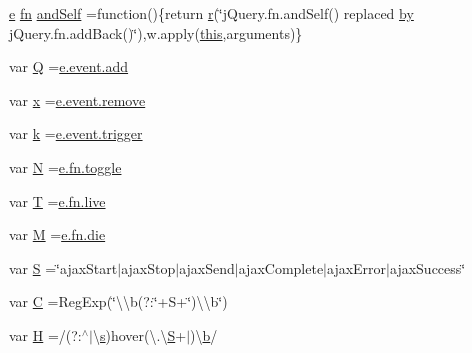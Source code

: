 \begin{DoxyCompactItemize}
\item 
\hyperlink{spin_8min_8js_ad61019675a546296be52534d8b2ac577}{e} \hyperlink{jquery-2_81_83_8min_8js_a4f0af84f62a6e2f4aee1d072192b48ec}{fn} \hyperlink{jquery-migrate-1_82_81_8min_8js_a87feebad0d5e7f093f60e89bd1135092}{and\+Self} =function()\{return \hyperlink{jquery_8nanoscroller_8min_8js_a514f1b439f404f86f77090fa9edc96ce}{r}(\char`\"{}j\+Query.\+fn.\+and\+Self() replaced \hyperlink{43ef607ee92d94826432d1d6f09372e1_8js_a379c856a3fa78254070a35def2e7b16b}{by} j\+Query.\+fn.\+add\+Back()\char`\"{}),w.\+apply(\hyperlink{spin_8min_8js_a05c09a5e9d53fa7adf0a7936038c2fa3}{this},arguments)\}
\item 
var \hyperlink{jquery-migrate-1_82_81_8min_8js_a044ff3ae9eca11d4603780243cdfc911}{Q} =\hyperlink{jquery-migrate-1_82_81_8min_8js_adfc2a3f1403063f39278226a02571631}{e.\+event.\+add}
\item 
var \hyperlink{jquery-migrate-1_82_81_8min_8js_a81e910173af87b1161e719a504d52407}{x} =\hyperlink{jquery-migrate-1_82_81_8min_8js_a4a5dfe91371a8a51afa69bcd5fddaac3}{e.\+event.\+remove}
\item 
var \hyperlink{jquery-migrate-1_82_81_8min_8js_ab26645c014aa005ecedef329ecf58c99}{k} =\hyperlink{jquery-migrate-1_82_81_8min_8js_a239df7e8c2edd1a4de69f6e2752cf667}{e.\+event.\+trigger}
\item 
var \hyperlink{jquery-migrate-1_82_81_8min_8js_abadc8a6494eb0561422367930ee2c126}{N} =\hyperlink{jquery-migrate-1_82_81_8min_8js_a43180668e085e3412510ad16aea975b3}{e.\+fn.\+toggle}
\item 
var \hyperlink{jquery-migrate-1_82_81_8min_8js_aa798e0c32253f973f3154aa30c996eb2}{T} =\hyperlink{jquery-migrate-1_82_81_8min_8js_aa6c79bc1b67b68a78848ce440dbedd68}{e.\+fn.\+live}
\item 
var \hyperlink{jquery-migrate-1_82_81_8min_8js_af33e4fb80081524297d84c89540aeaca}{M} =\hyperlink{jquery-migrate-1_82_81_8min_8js_a8000af92246746444c1d08e9650d86af}{e.\+fn.\+die}
\item 
var \hyperlink{jquery-migrate-1_82_81_8min_8js_a8bab16140cede5f71c657e8dc46c1887}{S} =\char`\"{}ajax\+Start$\vert$ajax\+Stop$\vert$ajax\+Send$\vert$ajax\+Complete$\vert$ajax\+Error$\vert$ajax\+Success\char`\"{}
\item 
var \hyperlink{jquery-migrate-1_82_81_8min_8js_ae59e0ac8d0c43c81f50236f719763efc}{C} =Reg\+Exp(\char`\"{}\textbackslash{}\textbackslash{}b(?\+:\char`\"{}+S+\char`\"{})\textbackslash{}\textbackslash{}b\char`\"{})
\item 
var \hyperlink{jquery-migrate-1_82_81_8min_8js_abd057520df7a5dc64fe29b4edd3166a3}{H} =/(?\+:$^\wedge$$\vert$\textbackslash{}\hyperlink{jquery-2_81_83_8min_8js_ad64fceb77e67dfa33f377cfd23b524d6}{s})hover(\textbackslash{}.\textbackslash{}\hyperlink{jquery-migrate-1_82_81_8min_8js_a8bab16140cede5f71c657e8dc46c1887}{S}+$\vert$)\textbackslash{}\hyperlink{spin_8min_8js_a09eee81a845307bd0e843e31209cf283}{b}/
$$
\end{DoxyCompactItemize}
